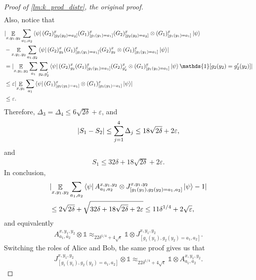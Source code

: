 \documentclass[10pt,a4paper]{article}
\theoremstyle{plain}
\theoremstyle{definition}
\DeclarePairedDelimiter{\abs}{\lvert}{\rvert}
\newcommand {\bra} [1] {\ensuremath{ \left\langle #1 \right| }}
\newcommand {\ket} [1] {\ensuremath{ \left| #1 \right\rangle }}
\DeclareMathOperator*{\bigE}{\mathbb{E}}
\newcommand {\id} {\ensuremath{\mathds{1}}}
\newcommand{\ep} {\ensuremath{\varepsilon}}
\newcommand{\x}{\otimes}
\newcommand{\appd}[1]{\approx_{#1}}
\newcommand{\1}{\mathbb{1}} %
\newcommand{\se}{\sqrt{\epsilon}}
\begin{document}
\begin{proof}[Proof of \cref{lm:k_prod_distr}, the original proof]
\begin{align*}
	\end{align*}	
	Also, notice that
	\begin{align*}
		&\abs{ \bigE_{x,y_1,y_2} \sum_{a_1, a_2} \bra{\psi}  
		(G_2)^x_{[g_2(y_2) = a_2]} (G_1)^x_{[g_1(y_1) = a_1]}  (G_2)^x_{[g_2(y_2) = a_2]}  \x  (G_1)^x_{[g_1(y_1) = a_1]} \ket{\psi} \\
		&- \bigE_{x,y_1,y_2} \sum_{a_1, g_2} \bra{\psi}  
		(G_2)^x_{g_2} (G_1)^x_{[g_1(y_1) = a_1]}  (G_2)^x_{g_2}  \x  (G_1)^x_{[g_1(y_1) = a_1]} \ket{\psi}} \\
		&= \abs{  \bigE_{x,y_1,y_2} \sum_{a_1} \sum_{g_2, g_2'} \bra{\psi} (G_2)^x_{g_2} (G_1)^x_{[g_1(y_1) = a_1]}  (G_2)^x_{g_2'}  \x  (G_1)^x_{[g_1(y_1) = a_1]} \ket{\psi} \id[g_2(y_2) = g_2'(y_2)]}  \\
		&\leq \ep \abs{ \bigE_{x,y_1} \sum_{a_1} \bra{\psi} (G_1)^x_{[g_1(y_1) = a_1]} \x (G_1)^x_{[g_1(y_1) = a_1]} \ket{\psi}} \\
		&\leq \ep.
	\end{align*}
	Therefore, $\Delta_3 = \Delta_4 \leq 6\sqrt{2\delta}  + \ep$, and
	\begin{align*}
		\abs{ S_1 - S_2 } \leq \sum_{j = 1}^4 \Delta_j \leq 18\sqrt{2 \delta} + 2 \ep,
	\end{align*}
	and
	\begin{align*}
		S_1 \leq 32\delta + 18\sqrt{2\delta} + 2\ep.
	\end{align*}
	In conclusion,
	\begin{align*}
		&\abs{ \bigE_{x,y_1,y_2} \sum_{a_1, a_2} \bra{\psi} A^{x,y_1,y_2}_{a_1,a_2} \x J^{x,y_1,y_2}_{[g_1(y_1),g_2(y_2) = a_1, a_2]} \ket{\psi}  - 1} \\
		 &\leq 2\sqrt{2\delta} + \sqrt{ 32\delta + 18\sqrt{2\delta} + 2 \ep} \leq 11 \delta^{1/4} + 2 \sqrt{\ep},
	\end{align*}
	and equivalently
	\begin{align*}
		A^{x,y_1,y_2}_{a_1,a_2} \x \id \appd{22 \delta^{1/4} + 4\se} \id \x J^{x,y_1,y_2}_{[g_1(y_1),g_2(y_2) = a_1, a_2]}.
	\end{align*}
	Switching the roles of Alice and Bob, the same proof gives us that 
	\begin{align*}
		 J^{x,y_1,y_2}_{[g_1(y_1),g_2(y_2) = a_1, a_2]} \x \id \appd{22 \delta^{1/4} + 4\se} \id \x A^{x,y_1,y_2}_{a_1,a_2}.
	\end{align*}
	

\end{proof}
\end{document}
